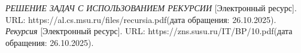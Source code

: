 \begin{thebibliography}{}
	\textit {РЕШЕНИЕ ЗАДАЧ С ИСПОЛЬЗОВАНИЕМ РЕКУРСИИ} [Электронный ресурс]. URL: https://al.cs.msu.ru/files/recursia.pdf(дата обращения: 26.10.2025).
	\textit {Рекурсия} [Электронный ресурс]. URL: 
	https://zns.susu.ru/IT/BP/10.pdf(дата обращения: 26.10.2025).
\end{thebibliography}

